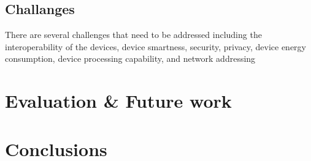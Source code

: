 \documentclass[conference]{IEEEtran}
\begin{document}
\subsection{Challanges}

There are several
challenges that need to be addressed including the interoperability
of the devices, device smartness, security, privacy,
device energy consumption, device processing capability, and
network addressing \cite{mic}

\section{Evaluation \& Future work   }


\section{Conclusions  }
\end{document}
